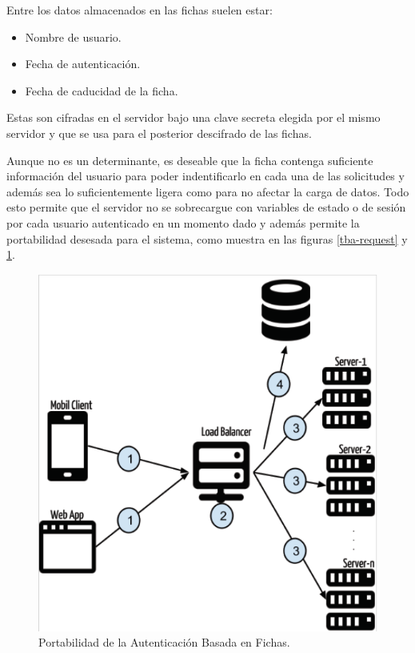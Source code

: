     Entre los datos almacenados en las fichas suelen estar:
    
    \begin{itemize}
        \item Nombre de usuario.
        \item Fecha de autenticación.
        \item Fecha de caducidad de la ficha.
    \end{itemize}

    
    Estas son cifradas en el servidor bajo una clave secreta elegida por el mismo servidor y que se usa para el posterior descifrado de las fichas.
    
    Aunque no es un determinante, es deseable que la ficha contenga suficiente información del usuario para poder indentificarlo en cada una de las solicitudes y además sea lo suficientemente ligera como para no afectar la carga de datos. Todo esto permite que el servidor no se sobrecargue con variables de estado o de sesión por cada usuario autenticado en un momento dado y además permite la portabilidad desesada para el sistema, como muestra en las figuras \ref{tba-request} y \ref{tba-server}.
    
    \begin{figure}[htbp!]
        \begin{center}
            \includegraphics[width=.7\textwidth]{figures/tokenbaservers}
        \end{center}
        \caption{Portabilidad de la Autenticación Basada en Fichas.}
        \label{tba-server}
    \end{figure}
    
\pagebreak